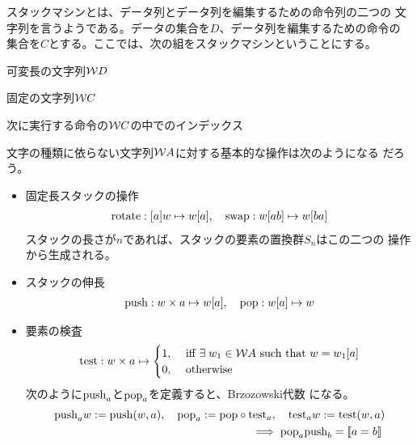 {	スタックマシンとは、データ列とデータ列を編集するための命令列の二つの
	文字列を言うようである。データの集合を$D$、データ列を編集するための命令の
	集合を$C$とする。ここでは、次の組をスタックマシンということにする。
	\begin{description}\setlength{\itemsep}{-1mm} %
		\item[データ列] 可変長の文字列${{\mathcal{W}}} D$
		\item[命令列] 固定の文字列${{\mathcal{W}}} C$
		\item[命令位置] 次に実行する命令の${{\mathcal{W}}} C$の中でのインデックス
	\end{description} %
	文字の種類に依らない文字列${{\mathcal{W}}} A$に対する基本的な操作は次のようになる
	だろう。
	\begin{itemize}\setlength{\itemsep}{-1mm} %
		\item 固定長スタックの操作
		\begin{equation*}\begin{split}
			{\ensuremath{\operatorname{rotate}}}: [a]w\mapsto w[a],\quad {\ensuremath{\operatorname{swap}}}: w[ab]\mapsto w[ba]
		\end{split}\end{equation*}
		スタックの長さが$n$であれば、スタックの要素の置換群$S_n$はこの二つの
		操作から生成される。
		\item スタックの伸長
		\begin{equation*}\begin{split}
			{\ensuremath{\operatorname{push}}}: w\times a\mapsto w[a],\quad {\ensuremath{\operatorname{pop}}}: w[a]\mapsto w
		\end{split}\end{equation*}
		\item 要素の検査
		\begin{equation*}\begin{split}
			{\ensuremath{\operatorname{test}}}: w\times a\mapsto \begin{cases}
				1, &\text{ iff } \exists\; w_1\in{\ensuremath{{\mathcal{W}}}} A\text{ such that } 
					w = w_1[a] \\
				0, &\text{ otherwise } \\
			\end{cases}
		\end{split}\end{equation*}
		次のように${\operatorname{push}}_a$と${\operatorname{pop}}_a$を定義すると、Brzozowski代数
		になる。
		\begin{equation*}\begin{split}
			{\ensuremath{\operatorname{push}}}_aw := {\operatorname{push}}(w,a),\quad
			{\ensuremath{\operatorname{pop}}}_a := {\operatorname{pop}}\circ{\ensuremath{\operatorname{test}}}_a,\quad
			{\ensuremath{\operatorname{test}}}_aw := {\operatorname{test}}(w,a) \\
			\implies {\ensuremath{\operatorname{pop}}}_a{\operatorname{push}}_b =  [\![a=b]\!]\; 
		\end{split}\end{equation*}
	\end{itemize} %
}
